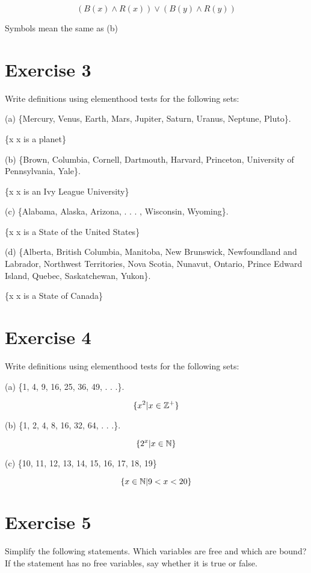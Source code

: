 \documentclass[11pt]{article}
\begin{document}
$$(B(x) \wedge R(x)) \vee (B(y) \wedge R(y))$$

Symbols mean the same as (b)

\section*{Exercise 3}

Write definitions using elementhood tests for the following sets:
    
\noindent (a) \{Mercury, Venus, Earth, Mars, Jupiter, Saturn, Uranus, Neptune, Pluto\}.

\{x \textpipe x is a planet\}

\noindent (b) \{Brown, Columbia, Cornell, Dartmouth, Harvard, Princeton, University of Pennsylvania, Yale\}.

\{x \textpipe x is an Ivy League University\}

\noindent (c) \{Alabama, Alaska, Arizona, . . . , Wisconsin, Wyoming\}.

\{x \textpipe x is a State of the United States\}

\noindent (d) \{Alberta, British Columbia, Manitoba, New Brunswick, Newfoundland and Labrador, Northwest Territories, Nova Scotia, Nunavut, Ontario, Prince Edward Island, Quebec, Saskatchewan, Yukon\}.

\{x \textpipe x is a State of Canada\}

\section*{Exercise 4}

Write definitions using elementhood tests for the following sets:

\noindent (a) \{1, 4, 9, 16, 25, 36, 49, . . .\}.

$$\{x^2 \text{\textbar} x \in \mathbb{Z}^+ \}$$

\noindent (b) \{1, 2, 4, 8, 16, 32, 64, . . .\}.

$$\{2^x \text{\textbar} x \in \mathbb{N} \}$$

\noindent (c) \{10, 11, 12, 13, 14, 15, 16, 17, 18, 19\}

$$\{x \in \mathbb{N} \text{\textbar} 9 < x < 20 \}$$

\section*{Exercise 5}

Simplify the following statements. Which variables are free and which are bound? If the statement has no free variables, say whether it is true or false.
\end{document}
